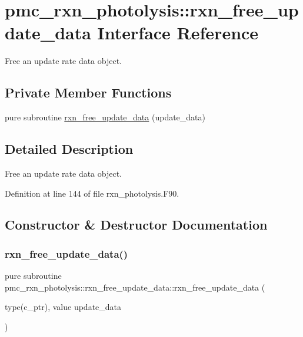 \hypertarget{interfacepmc__rxn__photolysis_1_1rxn__free__update__data}{}\section{pmc\+\_\+rxn\+\_\+photolysis\+:\+:rxn\+\_\+free\+\_\+update\+\_\+data Interface Reference}
\label{interfacepmc__rxn__photolysis_1_1rxn__free__update__data}


Free an update rate data object.  


\subsection*{Private Member Functions}
\begin{DoxyCompactItemize}
\item 
pure subroutine \mbox{\hyperlink{interfacepmc__rxn__photolysis_1_1rxn__free__update__data_a379b4287cb3662affa1a176048037a2e}{rxn\+\_\+free\+\_\+update\+\_\+data}} (update\+\_\+data)
\end{DoxyCompactItemize}


\subsection{Detailed Description}
Free an update rate data object. 

Definition at line 144 of file rxn\+\_\+photolysis.\+F90.



\subsection{Constructor \& Destructor Documentation}
\mbox{\label{interfacepmc__rxn__photolysis_1_1rxn__free__update__data_a379b4287cb3662affa1a176048037a2e}} 
\subsubsection{\texorpdfstring{rxn\+\_\+free\+\_\+update\+\_\+data()}{rxn\_free\_update\_data()}}
{\footnotesize\ttfamily pure subroutine pmc\+\_\+rxn\+\_\+photolysis\+::rxn\+\_\+free\+\_\+update\+\_\+data\+::rxn\+\_\+free\+\_\+update\+\_\+data (\begin{DoxyParamCaption}\item[{type(c\+\_\+ptr), value}]{update\+\_\+data }\end{DoxyParamCaption})\hspace{0.3cm}{\ttfamily [private]}}


